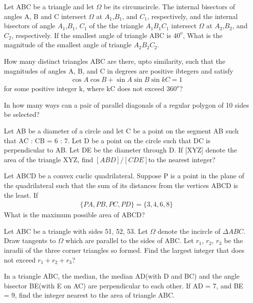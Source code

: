 \item Let ABC be a triangle and let $\Omega$ be its circumcircle. The internal bisectors of angles A, B and C intersect
$\Omega$ at $A_1$,$B_1$, and $C_1$, respectively, and the internal bisectors of angle $A_1$,$B_1$, $C_1$ of the the triangle $A_1B_1C_1$ intersect $\Omega$ at $A_2$,$B_2$, and $C_2$, respectively. If the smallest angle of triangle ABC is 
$40^{o}$, What is the magnitude of the smallest angle of triangle $A_2B_2C_2$.

\item How many distinct triangles ABC are there, upto similarity, such that the magnitudes of angles A, B, and C in degrees are positive ibtegers and satisfy
\begin{align*}
\cos A \cos B + \sin A \sin B \sin kC = 1
\end{align*}
for some positive integer k, where kC does not exceed $360^{o}$?

\item In how many ways can a pair of parallel diagonals of a regular polygon of 10 sides be selected?

\item Let AB be a diameter of a circle and let C be a point on the segment AB such that AC : CB = 6 : 7. Let D be a point on the circle such that DC is perpendicular to AB. Let DE be the diameter through D. If [XYZ] denote the area of the triangle XYZ, find $[ABD]/[CDE]$to the nearest integer?

\item Let ABCD be a convex cuclic quadrilateral. Suppose P is a point in the plane of the quadrilateral such that the sum of its distances from the vertices ABCD is the least. If
\begin{align*}
\{PA, PB, PC, PD\} = \{3, 4, 6, 8\}
\end{align*}
What is the maximum possible area of ABCD?

\item Let ABC be a triangle with sides 51, 52, 53. Let $\Omega$ denote the incircle of $\Delta ABC$. Draw tangents to $\Omega$ which are parallel to the sides of ABC. Let $r_1$, $r_2$, $r_3$ be the inradii of the three corner triangles so formed. Find the largest integer that does not exceed $r_1 + r_2 + r_3$?

\item In a triangle ABC, the median, the median AD(with D and BC) and the angle bisector BE(with E on AC) are perpendicular to each other. If AD = 7, and BE = 9, find the integer nearest to the area of triangle ABC.